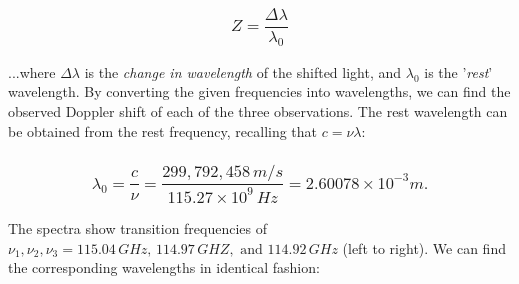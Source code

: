 \documentclass[
]{article}
\begin{document}
\hypertarget{z-fracdeltalambdalambda_0}{%
\subsubsection{\texorpdfstring{{\[Z = \frac{\Delta\lambda}{\lambda_{0}}\]}}{Z = \textbackslash frac\{\textbackslash Delta\textbackslash lambda\}\{\textbackslash lambda\_\{0\}\}}}\label{z-fracdeltalambdalambda_0}}

...where {\(\Delta\lambda\)} is the \emph{change in wavelength} of the
shifted light, and {\(\lambda_{0}\)} is the '\emph{rest}' wavelength. By
converting the given frequencies into wavelengths, we can find the
observed Doppler shift of each of the three observations. The rest
wavelength can be obtained from the rest frequency, recalling that
{\(c = \nu\lambda\)}:

\hypertarget{lambda_0-fraccnu-frac299792458-ms115.27-times-109-hz-2.60078-times-10--3m.}{%
\subsubsection{\texorpdfstring{{\[\lambda_{0} = \frac{c}{\nu} = \frac{299,792,458\, m/s}{115.27 \times 10^{9}\, Hz} = 2.60078 \times 10^{- 3}m.\]}}{\textbackslash lambda\_\{0\} = \textbackslash frac\{c\}\{\textbackslash nu\} = \textbackslash frac\{299,792,458\textbackslash, m/s\}\{115.27 \textbackslash times 10\^{}\{9\}\textbackslash, Hz\} = 2.60078 \textbackslash times 10\^{}\{- 3\}m.}}\label{lambda_0-fraccnu-frac299792458-ms115.27-times-109-hz-2.60078-times-10--3m.}}

The spectra show transition frequencies of
{\(\nu_{1},\nu_{2},\nu_{3} = 115.04\, GHz,\, 114.97\, GHZ,\text{~and~}114.92\, GHz\)}
(left to right). We can find the corresponding wavelengths in identical
fashion:
\end{document}
